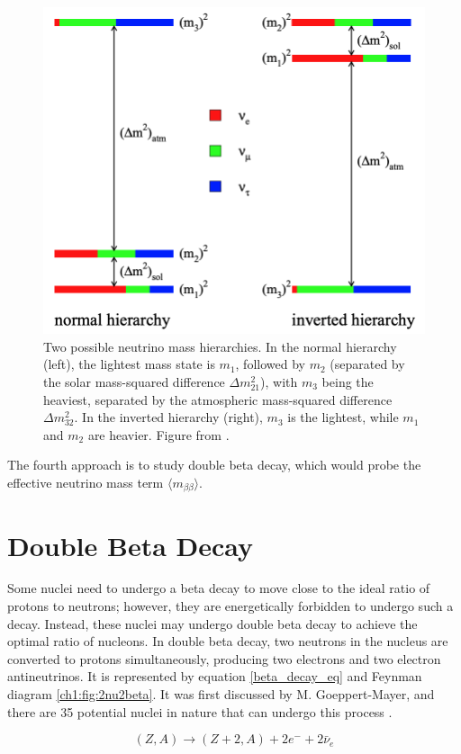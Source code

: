\begin{figure}[!htb]
\centering
\includegraphics[width=0.75\linewidth]{ch1/figs/mass_hierarchies.png}
\caption{Two possible neutrino mass hierarchies. In the normal hierarchy (left), the lightest mass state is $ m_1 $, followed by $ m_2 $ (separated by the solar mass-squared difference $ \Delta m^2_{21} $), with $ m_3 $ being the heaviest, separated by the atmospheric mass-squared difference $ \Delta m^2_{32} $. In the inverted hierarchy (right), $ m_3 $ is the lightest, while $ m_1 $ and $ m_2 $ are heavier. Figure from \cite{Hewett:2012ns}.}
\label{mass_hierarchies_fig}
\end{figure}

The fourth approach is to study double beta decay, which would probe the effective neutrino mass term $\langle m_{\beta\beta}\rangle$.

\section{Double Beta Decay}
Some nuclei need to undergo a beta decay to move close to the ideal ratio of protons to neutrons; however, they are energetically forbidden to undergo such a decay. Instead, these nuclei may undergo double beta decay to achieve the optimal ratio of nucleons. In double beta decay, two neutrons in the nucleus are converted to protons simultaneously, producing two electrons and two electron antineutrinos. It is represented by equation \ref{beta_decay_eq} and Feynman diagram \ref{ch1:fig:2nu2beta}. It was first discussed by M. Goeppert-Mayer, and there are 35 potential nuclei in nature that can undergo this process \cite{ZUBER_2012}.

\begin{equation}\label{beta_decay_eq}
(Z,A) \rightarrow (Z+2,A) + 2e^- + 2\bar{\nu}_e
\end{equation}

